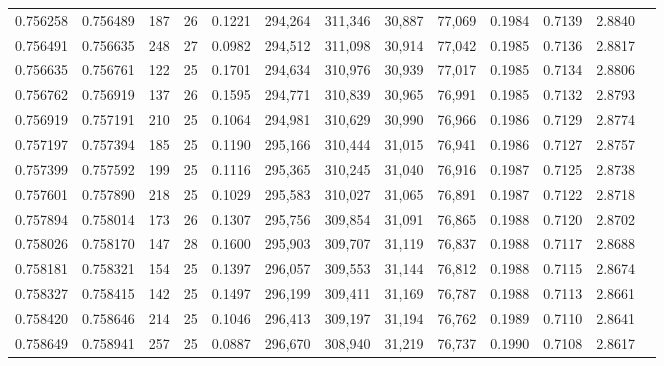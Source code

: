 \begin{tabular}{rrrrrrrrrrrrr}
0.756258 & 0.756489 &   187 &  26 &                                     0.1221 & 294,264 & 311,346 &  30,887 &  77,069 & 0.1984 & 0.7139 & 2.8840 \\
0.756491 & 0.756635 &   248 &  27 &                                     0.0982 & 294,512 & 311,098 &  30,914 &  77,042 & 0.1985 & 0.7136 & 2.8817 \\
0.756635 & 0.756761 &   122 &  25 &                                     0.1701 & 294,634 & 310,976 &  30,939 &  77,017 & 0.1985 & 0.7134 & 2.8806 \\
0.756762 & 0.756919 &   137 &  26 &                                     0.1595 & 294,771 & 310,839 &  30,965 &  76,991 & 0.1985 & 0.7132 & 2.8793 \\
0.756919 & 0.757191 &   210 &  25 &                                     0.1064 & 294,981 & 310,629 &  30,990 &  76,966 & 0.1986 & 0.7129 & 2.8774 \\
0.757197 & 0.757394 &   185 &  25 &                                     0.1190 & 295,166 & 310,444 &  31,015 &  76,941 & 0.1986 & 0.7127 & 2.8757 \\
0.757399 & 0.757592 &   199 &  25 &                                     0.1116 & 295,365 & 310,245 &  31,040 &  76,916 & 0.1987 & 0.7125 & 2.8738 \\
0.757601 & 0.757890 &   218 &  25 &                                     0.1029 & 295,583 & 310,027 &  31,065 &  76,891 & 0.1987 & 0.7122 & 2.8718 \\
0.757894 & 0.758014 &   173 &  26 &                                     0.1307 & 295,756 & 309,854 &  31,091 &  76,865 & 0.1988 & 0.7120 & 2.8702 \\
0.758026 & 0.758170 &   147 &  28 &                                     0.1600 & 295,903 & 309,707 &  31,119 &  76,837 & 0.1988 & 0.7117 & 2.8688 \\
0.758181 & 0.758321 &   154 &  25 &                                     0.1397 & 296,057 & 309,553 &  31,144 &  76,812 & 0.1988 & 0.7115 & 2.8674 \\
0.758327 & 0.758415 &   142 &  25 &                                     0.1497 & 296,199 & 309,411 &  31,169 &  76,787 & 0.1988 & 0.7113 & 2.8661 \\
0.758420 & 0.758646 &   214 &  25 &                                     0.1046 & 296,413 & 309,197 &  31,194 &  76,762 & 0.1989 & 0.7110 & 2.8641 \\
0.758649 & 0.758941 &   257 &  25 &                                     0.0887 & 296,670 & 308,940 &  31,219 &  76,737 & 0.1990 & 0.7108 & 2.8617 \\

\end{tabular}
